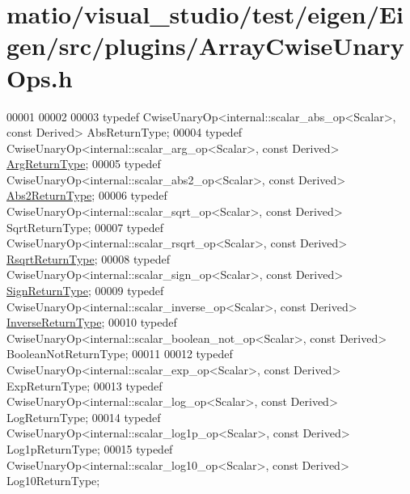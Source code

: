 \hypertarget{matio_2visual__studio_2test_2eigen_2_eigen_2src_2plugins_2_array_cwise_unary_ops_8h_source}{}\section{matio/visual\+\_\+studio/test/eigen/\+Eigen/src/plugins/\+Array\+Cwise\+Unary\+Ops.h}
\label{matio_2visual__studio_2test_2eigen_2_eigen_2src_2plugins_2_array_cwise_unary_ops_8h_source}

\begin{DoxyCode}
00001 
00002 
00003 \textcolor{keyword}{typedef} CwiseUnaryOp<internal::scalar\_abs\_op<Scalar>, \textcolor{keyword}{const} Derived> AbsReturnType;
00004 \textcolor{keyword}{typedef} CwiseUnaryOp<internal::scalar\_arg\_op<Scalar>, \textcolor{keyword}{const} Derived> 
      \hyperlink{group___core___module_class_eigen_1_1_cwise_unary_op}{ArgReturnType};
00005 \textcolor{keyword}{typedef} CwiseUnaryOp<internal::scalar\_abs2\_op<Scalar>, \textcolor{keyword}{const} Derived> 
      \hyperlink{group___core___module_class_eigen_1_1_cwise_unary_op}{Abs2ReturnType};
00006 \textcolor{keyword}{typedef} CwiseUnaryOp<internal::scalar\_sqrt\_op<Scalar>, \textcolor{keyword}{const} Derived> SqrtReturnType;
00007 \textcolor{keyword}{typedef} CwiseUnaryOp<internal::scalar\_rsqrt\_op<Scalar>, \textcolor{keyword}{const} Derived> 
      \hyperlink{group___core___module_class_eigen_1_1_cwise_unary_op}{RsqrtReturnType};
00008 \textcolor{keyword}{typedef} CwiseUnaryOp<internal::scalar\_sign\_op<Scalar>, \textcolor{keyword}{const} Derived> 
      \hyperlink{group___core___module_class_eigen_1_1_cwise_unary_op}{SignReturnType};
00009 \textcolor{keyword}{typedef} CwiseUnaryOp<internal::scalar\_inverse\_op<Scalar>, \textcolor{keyword}{const} Derived> 
      \hyperlink{group___core___module_class_eigen_1_1_cwise_unary_op}{InverseReturnType};
00010 \textcolor{keyword}{typedef} CwiseUnaryOp<internal::scalar\_boolean\_not\_op<Scalar>, \textcolor{keyword}{const} Derived> BooleanNotReturnType;
00011 
00012 \textcolor{keyword}{typedef} CwiseUnaryOp<internal::scalar\_exp\_op<Scalar>, \textcolor{keyword}{const} Derived> ExpReturnType;
00013 \textcolor{keyword}{typedef} CwiseUnaryOp<internal::scalar\_log\_op<Scalar>, \textcolor{keyword}{const} Derived> LogReturnType;
00014 \textcolor{keyword}{typedef} CwiseUnaryOp<internal::scalar\_log1p\_op<Scalar>, \textcolor{keyword}{const} Derived> Log1pReturnType;
00015 \textcolor{keyword}{typedef} CwiseUnaryOp<internal::scalar\_log10\_op<Scalar>, \textcolor{keyword}{const} Derived> Log10ReturnType;

\end{DoxyCode}
